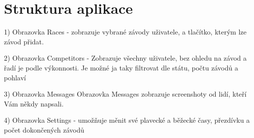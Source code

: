 \documentclass{article}
\begin{document}
\vspace{10 mm}




\vspace{10 mm}
\section{Struktura aplikace}

1) Obrazovka Races - zobrazuje vybrané závody uživatele, a tlačítko, kterým lze závod přidat.

\vspace{10 mm}


















2) Obrazovka Competitors - Zobrazuje všechny uživatele, bez ohledu na závod a řadí je podle výkonnosti. Je možné ja taky filtrovat dle státu, počtu závodů a pohlaví

\vspace{10 mm}













3) Obrazovka Messages
\vspace{10 mm}
Obrazovka Messages zobrazuje screenshoty od lidí, kteří Vám někdy napsali.
\vspace{10 mm}





















4) Obrazovka Settings - umožňuje měnit své plavecké a běžecké časy, přezdívku a počet dokončených závodů
\vspace{10 mm}
\end{document}
